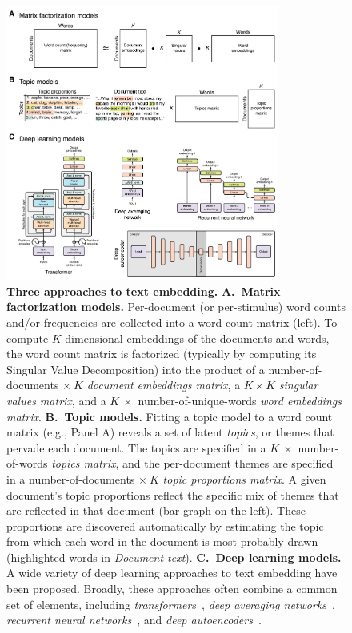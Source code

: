\documentclass{article}
\begin{document}
\begin{figure}[tp]
\centering
\includegraphics[width=0.8\textwidth]{figs/word_embedding_models}
\caption{\textbf{Three approaches to text embedding.}  \textbf{A.~Matrix factorization models.} Per-document (or per-stimulus) word counts and/or frequencies are collected into a word count matrix (left).  To compute $K$-dimensional embeddings of the documents and words, the word count matrix is factorized (typically by computing its Singular Value Decomposition) into the product of a number-of-documents $\times~K$ \textit{document embeddings matrix}, a $K \times K$ \textit{singular values matrix}, and a $K~\times $ number-of-unique-words \textit{word embeddings matrix}.  \textbf{B.~Topic models.}  Fitting a topic model to a word count matrix (e.g., Panel A) reveals a set of latent \textit{topics}, or themes that pervade each document.  The topics are specified in a $K~\times$ number-of-words \textit{topics matrix}, and the per-document themes are specified in a number-of-documents $\times~K$ \textit{topic proportions matrix}. A given document's topic proportions reflect the specific mix of themes that are reflected in that document (bar graph on the left).  These proportions are discovered automatically by estimating the topic from which each word in the document is most probably drawn (highlighted words in \textit{Document text}).  \textbf{C.~Deep learning models.}  A wide variety of deep learning approaches to text embedding have been proposed.  Broadly, these approaches often combine a common set of elements, including \textit{transformers}~\citep[diagram adapted from][]{ViswEtal17}, \textit{deep averaging networks}~\citep[diagram adapted from][]{IyyeEtal15}, \textit{recurrent neural networks}~\citep[diagram adapted from][]{IyyeEtal15}, and \textit{deep autoencoders}~\citep[diagram adapted from][]{YousHame17}.}
\label{fig:embedding-models}
\end{figure}
\end{document}

